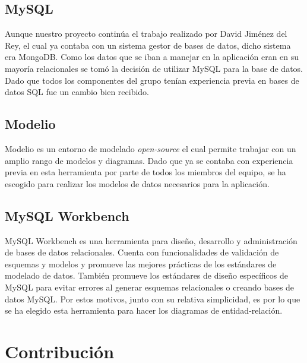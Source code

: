 \documentclass[11pt]{book}
\begin{document}
\section{MySQL}
Aunque nuestro proyecto continúa el trabajo realizado por David Jiménez del Rey, el cual ya contaba con un sistema gestor de bases de datos, dicho sistema era MongoDB. Como los datos que se iban a manejar en la aplicación eran en su mayoría relacionales se tomó la decisión de utilizar MySQL para la base de datos. Dado que todos los componentes del grupo tenían experiencia previa en bases de datos SQL fue un cambio bien recibido.

\section{Modelio}	
Modelio es un entorno de modelado \emph{open-source} el cual permite trabajar con un amplio rango de modelos y diagramas. Dado que ya se contaba con experiencia previa en esta herramienta por parte de todos los miembros del equipo, se ha escogido para realizar los modelos de datos necesarios para la aplicación.

\section{MySQL Workbench}
MySQL Workbench es una herramienta para diseño, desarrollo y administración de bases de datos relacionales. 
Cuenta con funcionalidades de validación de esquemas y modelos y promueve las mejores prácticas de los estándares de modelado de datos. También promueve los estándares de diseño específicos de MySQL para evitar errores al generar esquemas relacionales o creando bases de datos MySQL. Por estos motivos, junto con su relativa simplicidad, es por lo que se ha elegido esta herramienta para hacer los diagramas de entidad-relación.

\chapter{Contribución}
	\newpage
\end{document}
